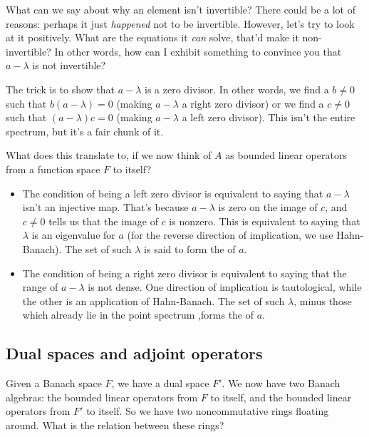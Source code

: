 \documentclass[a4paper]{amsart}
\begin{document}
What can we say about why an element isn't invertible? There could be
a lot of reasons: perhaps it just {\em happened} not to be
invertible. However, let's try to look at it positively. What are the
equations it {\em can} solve, that'd make it non-invertible? In other
words, how can I exhibit something to convince you that $a - \lambda$
is not invertible?

The trick is to show that $a - \lambda$ is a zero divisor. In other
words, we find a $b \ne 0$ such that $b(a - \lambda) = 0$ (making $a -
\lambda$ a right zero divisor) or we find a $c \ne 0$ such that $(a -
\lambda)c = 0$ (making $a - \lambda$ a left zero divisor). This isn't
the entire spectrum, but it's a fair chunk of it.

What does this translate to, if we now think of $A$ as bounded linear
operators from a function space $F$ to itself?

\begin{itemize}

\item The condition of being a left zero divisor is equivalent to
  saying that $a - \lambda$ isn't an injective map. That's because $a
  - \lambda$ is zero on the image of $c$, and $c \ne 0$ tells us that
  the image of $c$ is nonzero. This is equivalent to saying that
  $\lambda$ is an eigenvalue for $a$ (for the reverse direction of
  implication, we use Hahn-Banach). The set of such $\lambda$ is said
  to form the  of $a$.

\item The condition of being a right zero divisor is equivalent to
  saying that the range of $a - \lambda$ is not dense. One direction
  of implication is tautological, while the other is an application of
  Hahn-Banach. The set of such $\lambda$, minus those which already
  lie in the point spectrum ,forms the 
  of $a$.

\end{itemize}

\subsection{Dual spaces and adjoint operators}

Given a Banach space $F$, we have a dual space $F'$. We now have two
Banach algebras: the bounded linear operators from $F$ to itself, and
the bounded linear operators from $F'$ to itself. So we have two
noncommutative rings floating around. What is the relation between
these rings?
\end{document}
